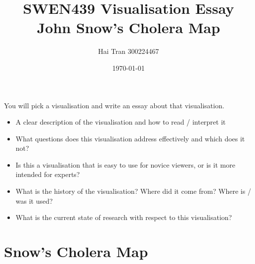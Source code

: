 \documentclass[12pt]{article}
\title{SWEN439 Visualisation Essay \\ John Snow's Cholera Map}
\author{Hai Tran 300224467}
\date{\today}
\begin{document}
\maketitle 

\begin{abstract}
\end{abstract}

You will pick a visualisation and write an essay about that visualisation. 
 
\begin{itemize}
\item A clear description of the visualisation and how to read / interpret it
\item What questions does this visualisation address effectively and which does it not?
\item Is this a visualisation that is easy to use for novice viewers, or is it more intended for experts?
\item What is the history of the visualisation? Where did it come from? Where is / was it used?
\item What is the current state of research with respect to this visualisation?
\end{itemize}

\section{Snow's Cholera Map}
\end{document}
